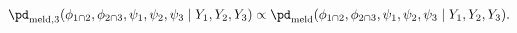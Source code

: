 \begin{equation}
  \pd_{\text{meld}, 3} (\phi_{1 \cap 2}, \phi_{2 \cap 3}, \psi_{1}, \psi_{2}, \psi_{3} \mid Y_{1}, Y_{2}, Y_{3}) \propto  \pd_{\text{meld}} (\phi_{1 \cap 2}, \phi_{2 \cap 3}, \psi_{1}, \psi_{2}, \psi_{3} \mid Y_{1}, Y_{2}, Y_{3}).
  \label{eqn:stage-three-target}
\end{equation}